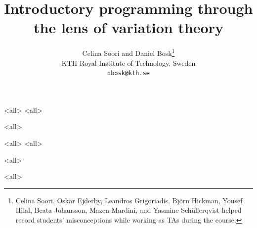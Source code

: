 \documentclass[ignoreframetext]{beamer}
\begin{document}

\title{%
  Introductory programming through the lens of variation theory%
}
\author{%
  Celina Soori
  and
  Daniel Bosk\thanks{%
    Celina Soori,
    Oskar Ejderby,
    Leandros Grigoriadis,
    Björn Hickman,
    Yousef Hilal,
    Beata Johansson,
    Mazen Mardini, and
    Yasmine Schüllerqvist
    helped record students' misconceptions while working as TAs during the 
    course.
  }%
  \\KTH Royal Institute of Technology, Sweden
  \\\texttt{dbosk@kth.se}
}

\mode*

\begin{frame}
  \maketitle
\end{frame}

\begin{abstract}
  
\end{abstract}

\begin{frame}
  \tableofcontents[subsectionstyle=hide,subsubsectionstyle=hide]
\end{frame}

\mode<all>{}
\mode<all>{}



\mode<all>{}

\mode<all>{}
\mode<all>{}









\mode<all>{}






\mode<all>{}

\begin{frame}[allowframebreaks]
\printbibliography
\end{frame}

\appendix

%
%
%
\end{document}
